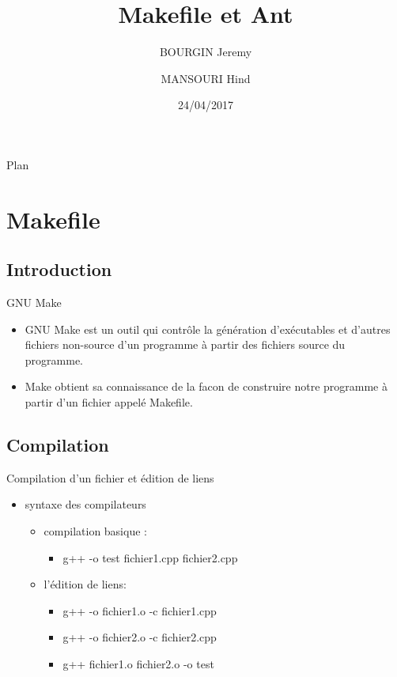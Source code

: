 \documentclass{beamer}
\title{Makefile et Ant}
\author{BOURGIN Jeremy\inst{1} \and MANSOURI Hind\inst{2}}
\institute[Université de Montpellier] %
{
  \inst{1}%
  L2 INFORMATIQUE
  \and
  \inst{2}%
   Techniques de Communication et de Conduite de projets
}
\date{24/04/2017}
\begin{document}
\begin{frame}{}
    \titlepage
\end{frame}

\begin{frame}{Plan}
  \tableofcontents
\end{frame}

\section{Makefile}

\subsection{Introduction}

\begin{frame}{GNU Make }
  \begin{itemize}
  \item {
   GNU Make est un outil qui contr\^ole la g\'en\'eration d'ex\'ecutables et d'autres fichiers non-source d'un programme \`a partir des fichiers source du programme.
  }
  \item {
    Make obtient sa connaissance de la facon de construire notre programme \`a partir d'un fichier appel\'e Makefile.
  }
  \end{itemize}
\end{frame}

\subsection{Compilation}

\begin{frame}{Compilation d'un fichier et \'edition de liens}

    \begin{itemize}
        \item syntaxe des compilateurs
        \begin{itemize}
            \item compilation basique : 
                \begin{itemize}
                    \item g++  -o test fichier1.cpp fichier2.cpp 
                \end{itemize}
            \item l'\'edition de liens:
                \begin{itemize}
                    \item g++ -o fichier1.o -c fichier1.cpp
                    \item g++ -o fichier2.o -c fichier2.cpp
                    \item g++ fichier1.o  fichier2.o -o test
                \end{itemize}
        \end{itemize}
    \end{itemize}
\end{frame}
\end{document}
